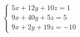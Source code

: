 \documentclass[preview]{standalone}
\begin{document}
\begin{align*}
\begin{cases} 5x + 12y + 10z = 1 \\ 9x + 40y + 5z = 5 \\ 9x + 2y + 19z = -10 \end{cases}
\end{align*}
\end{document}
